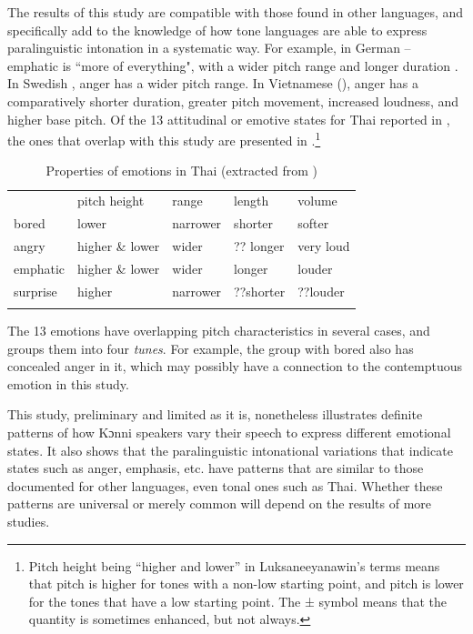 \documentclass[output=paper]{langsci/langscibook}
\begin{document}
The results of this study are compatible with those found in other languages, and specifically add to the knowledge of how tone languages are able to express paralinguistic intonation in a systematic way. For example, in German -- emphatic is ``more of everything", with a wider pitch range and longer duration \citep[91]{gibbon1998}.  In Swedish \citep[122--123]{garding1998}, anger has a wider pitch range. In Vietnamese (\citealt[402, 412--413]{doetal1998,brunelleetal2012}), anger has a comparatively shorter duration, greater pitch movement, increased loudness, and higher base pitch. Of the 13 attitudinal or emotive states for Thai reported in \citet[382]{luksaneeyanawin1998}, the ones that overlap with this study are presented in .\footnote{Pitch height being ``higher and lower'' in Luksaneeyanawin's terms means that pitch is higher for tones with a non-low starting point, and pitch is lower for the tones that have a low starting point. The ± symbol means that the quantity is sometimes enhanced, but not always.}


\begin{table}
\begin{tabular}{lllll} & pitch height & range & length & volume\\
\lsptoprule
bored & lower & narrower & shorter & softer\\
angry & higher \& lower & wider & ?? longer & very loud\\
emphatic & higher \& lower & wider & longer & louder\\
surprise & higher & narrower & ??shorter & ??louder\\
\lspbottomrule
\end{tabular}

\caption{Properties of emotions in Thai (extracted from \citealt[382]{luksaneeyanawin1998})}
\label{tab:6.cahill}

\end{table}



The 13 emotions have overlapping pitch characteristics in several cases, and \citeauthor{luksaneeyanawin1998} groups them into four \emph{tunes}. For example, the group with bored also has concealed anger in it, which may possibly have a connection to the contemptuous emotion in this study.

This study, preliminary and limited as it is, nonetheless illustrates definite patterns of how Kɔnni speakers vary their speech to express different emotional states. It also shows that the paralinguistic intonational variations that indicate states such as anger, emphasis, etc. have patterns that are similar to those documented for other languages, even tonal ones such as Thai. Whether these patterns are universal or merely common will depend on the results of more studies.
\end{document}
